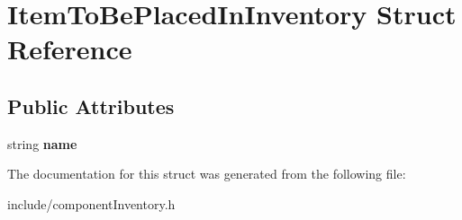 \hypertarget{structItemToBePlacedInInventory}{
\section{\-Item\-To\-Be\-Placed\-In\-Inventory \-Struct \-Reference}
\label{d9/d4c/structItemToBePlacedInInventory}
}
\subsection*{\-Public \-Attributes}
\begin{DoxyCompactItemize}
\item 
\hypertarget{structItemToBePlacedInInventory_a3916910cb94df5c16d4a82f3a1cc4d00}{
string {\bfseries name}}
\label{d9/d4c/structItemToBePlacedInInventory_a3916910cb94df5c16d4a82f3a1cc4d00}

\end{DoxyCompactItemize}


\-The documentation for this struct was generated from the following file\-:\begin{DoxyCompactItemize}
\item 
include/component\-Inventory.\-h\end{DoxyCompactItemize}
